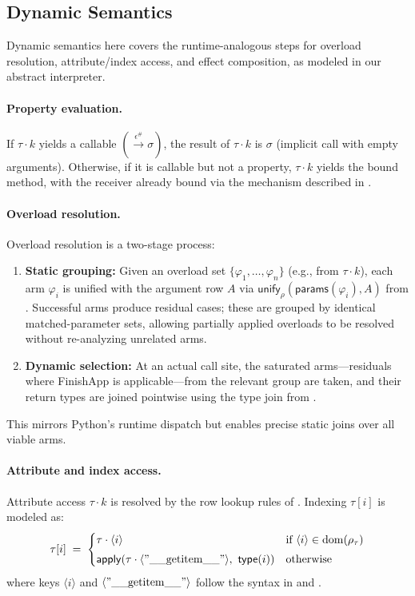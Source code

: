 \subsection{Dynamic Semantics}

Dynamic semantics here covers the runtime-analogous steps for overload resolution, attribute/index access, and effect composition, as modeled in our abstract interpreter.

\paragraph{Property evaluation.}
If $\tau \cdot k$ yields a callable $(\xrightarrow{\epsilon^\#} \sigma)$, 
the result of $\tau \cdot k$ is $\sigma$ (implicit call with empty arguments).  
Otherwise, if it is callable but not a property, $\tau \cdot k$ yields the bound method, with the receiver already bound via the mechanism described in .

\paragraph{Overload resolution.}
\label{sec:overload-resolution}
Overload resolution is a two-stage process:
\begin{enumerate}
\item \textbf{Static grouping:}  
  Given an overload set $\{\varphi_1, \ldots, \varphi_n\}$ (e.g., from $\tau \cdot k$), each arm $\varphi_i$ is unified with the argument row $A$ via  
  $\mathsf{unify}_{\rho}(\mathsf{params}(\varphi_i), A)$ from .  
  Successful arms produce residual cases; these are grouped by identical matched-parameter sets, allowing partially applied overloads to be resolved without re-analyzing unrelated arms.
\item \textbf{Dynamic selection:}  
  At an actual call site, the saturated arms---residuals where \textsf{FinishApp} is applicable---from the relevant group are taken, and their return types are joined pointwise using the type join from .
\end{enumerate}
This mirrors Python’s runtime dispatch but enables precise static joins over all viable arms.

\paragraph{Attribute and index access.}  
\label{sec:rows-generic-access}
Attribute access $\tau \cdot k$ is resolved by the row lookup rules of .  
Indexing $\tau[i]$ is modeled as:
\[
\tau[i] \;=\;
\begin{cases}
\tau \cdot \langle i\rangle & \text{if $\langle i\rangle \in \mathrm{dom}(\rho_\tau)$} \\[0.3em]
\mathsf{apply}(\tau \cdot \langle \mathrm{"\_\_getitem\_\_"}\rangle,\ \mathsf{type}(i)) & \text{otherwise}
\end{cases}
\]
where keys $\langle i\rangle$ and $\langle \mathrm{"\_\_getitem\_\_"}\rangle$ follow the syntax in  and .

